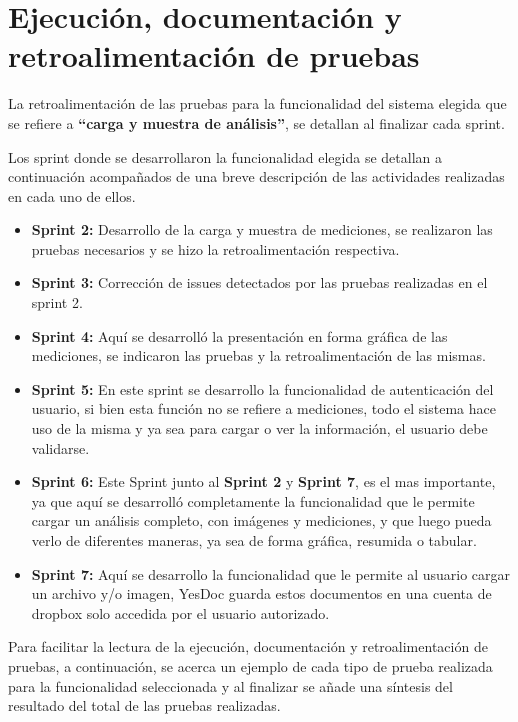 \section{Ejecución, documentación y retroalimentación de pruebas}
 La retroalimentación de las pruebas para la funcionalidad del sistema elegida que se refiere a \textbf{``carga y muestra de análisis''}, se detallan al finalizar cada sprint.
 
  Los sprint donde se desarrollaron la funcionalidad elegida se detallan a continuación acompañados de una breve descripción de las actividades realizadas en cada uno de ellos.
 \begin{itemize}
 	\item \textbf{Sprint 2:} Desarrollo de la carga y muestra de mediciones, se realizaron las pruebas necesarios y se hizo la retroalimentación respectiva.
 	\item \textbf{Sprint 3:} Corrección de issues detectados por las pruebas realizadas en el sprint 2.
 	\item \textbf{Sprint 4:} Aquí se desarrolló la presentación en forma gráfica de las mediciones, se indicaron las pruebas y la retroalimentación de las mismas.
 	\item \textbf{Sprint 5:} En este sprint se desarrollo la funcionalidad de autenticación del usuario, si bien esta función no se refiere a mediciones, todo el sistema hace uso de la misma y ya sea para cargar o ver la información, el usuario debe validarse.
 	\item \textbf{Sprint 6: } Este Sprint junto al \textbf{Sprint 2} y \textbf{Sprint 7}, es el mas importante, ya que aquí se desarrolló completamente la funcionalidad que le permite cargar un análisis completo, con imágenes y mediciones,  y que luego pueda verlo de diferentes maneras, ya sea de forma gráfica, resumida o tabular.
 	\item \textbf{Sprint 7: } Aquí se desarrollo la funcionalidad que le permite al usuario cargar un archivo y/o imagen, YesDoc guarda estos documentos en una cuenta de dropbox solo accedida por el usuario autorizado.
 \end{itemize}
 

 Para facilitar la lectura de la ejecución, documentación y retroalimentación de pruebas, a continuación, se acerca un ejemplo de cada tipo de prueba realizada para la funcionalidad seleccionada y al finalizar se añade  una síntesis del resultado del total de las pruebas realizadas.

